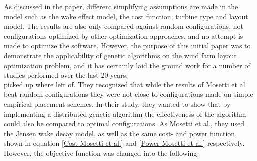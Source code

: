 \begin{center}
\begin{table}[h!]
\caption{Optimized configurations compared against random configurations for each of the three scenarios (a) single wind direction, (b) multiple wind direction with constant intensity and (c) multiple wind direction and intensity {\citep{Mosetti}}.}
\label{Results Mosetti et al.}
\end{table}
\end{center}


\noindent As discussed in the paper, different simplifying assumptions are made in the model such as the wake effect model, the cost function, turbine type and layout model. The results are also only compared against random configurations, not configurations optimized by other optimization approaches, and no attempt is made to optimize the software. However, the purpose of this initial paper was to demonstrate the applicability of genetic algorithms on the wind farm layout optimization problem, and it has certainly laid the ground work for a number of studies performed over the last 20 years. \\


\noindent \cite{Grady} picked up where \cite{Mosetti} left of. They recognized that while the results of Mosetti et al. beat random configurations they were not close to configurations made on simple empirical placement schemes. In their study, they wanted to show that by implementing a distributed genetic algorithm the effectiveness of the algorithm could also be compared to optimal configurations.	 As Mosetti et al., they used the Jensen wake decay model, as well as the same cost- and power function, shown in equation \ref{Cost Mosetti et al.} and \ref{Power Mosetti et al.} respectively. However, the objective function was changed into the following

